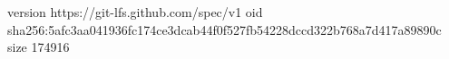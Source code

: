 version https://git-lfs.github.com/spec/v1
oid sha256:5afc3aa041936fc174ce3dcab44f0f527fb54228dccd322b768a7d417a89890c
size 174916
